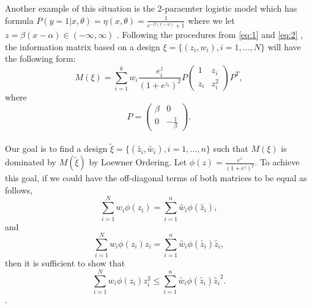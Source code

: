 \documentclass[11pt]{amsart}
\theoremstyle{definition}
\theoremstyle{remark}
\begin{document}
 Another example of this situation is the 2-paraemter logistic model which has formula $P(y=1|x,\theta) = \eta(x,\theta)= \frac{1}{e^{-\beta(x-\alpha)}+1}$ where we let $z = \beta(x-\alpha) \in (-\infty, \infty)$ . Following the procedures from \eqref{eq:1} and \eqref{eq:2} , the information matrix based on a design $\xi = \{(z_i,w_i), i=1,\ldots,N\}$ will have the following form: \begin{equation}
M(\xi) = \sum_{i=1}^{k} w_i \frac{e^z_i}{(1+e^{z_i})^2}P \left( \begin{array}{cc}
1 & z_i\\
z_i & z_i^2
\end{array} \right) P^T,
\end{equation} where \[P = \left( \begin{array}{cc}
\beta & 0\\
0 & -\frac{1}{\beta}
\end{array} \right).\] \\

Our goal is to find a design $\tilde{\xi} = \{(\tilde{z_i},\tilde{w_i}), i=1,\ldots,n\}$ such that $M(\xi)$ is dominated by $M(\tilde{\xi})$ by Loewner Ordering. Let $\phi(z) = \frac{e^z}{(1+e^{z})^2}$. To achieve this goal, if we could have the off-diagonal terms of both matrices to be equal as follows,
\begin{equation}\label{eq: beta_eq1}
\sum_{i=1}^{N} w_i \phi(z_i) = \sum_{i=1}^{n} \tilde{w_i}  \phi(\tilde{z_i}) ,
\end{equation}
and
\begin{equation}\label{eq: beta_eq2}
\sum_{i=1}^{N} w_i  \phi(z_i)z_i = \sum_{i=1}^{n} \tilde{w_i} \phi(\tilde{z_i}) \tilde{z_i},
\end{equation}
then it is sufficient to show that 
\begin{equation}\label{eq: beta_eq3}
\sum_{i=1}^{N} w_i \phi(z_i)z_i^2 \le \sum_{i=1}^{n} \tilde{w_i}\phi(\tilde{z_i})\tilde{z_i}^2.
\end{equation}.
\end{document}
